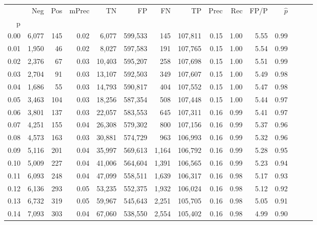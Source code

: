 \begin{tabular}{rrrrrrrrrrrrrrr}
\toprule
{} &     Neg &    Pos & mPrec &       TN &       FP &       FN &       TP &  Prec &   Rec &  FP/P & $\hat{p}$ \\
p    &         &        &       &          &          &          &          &       &       &       &           \\
\midrule
0.00 &   6,077 &    145 &  0.02 &    6,077 &  599,533 &      145 &  107,811 &  0.15 &  1.00 &  5.55 &      0.99 \\
0.01 &   1,950 &     46 &  0.02 &    8,027 &  597,583 &      191 &  107,765 &  0.15 &  1.00 &  5.54 &      0.99 \\
0.02 &   2,376 &     67 &  0.03 &   10,403 &  595,207 &      258 &  107,698 &  0.15 &  1.00 &  5.51 &      0.99 \\
0.03 &   2,704 &     91 &  0.03 &   13,107 &  592,503 &      349 &  107,607 &  0.15 &  1.00 &  5.49 &      0.98 \\
0.04 &   1,686 &     55 &  0.03 &   14,793 &  590,817 &      404 &  107,552 &  0.15 &  1.00 &  5.47 &      0.98 \\
0.05 &   3,463 &    104 &  0.03 &   18,256 &  587,354 &      508 &  107,448 &  0.15 &  1.00 &  5.44 &      0.97 \\
0.06 &   3,801 &    137 &  0.03 &   22,057 &  583,553 &      645 &  107,311 &  0.16 &  0.99 &  5.41 &      0.97 \\
0.07 &   4,251 &    155 &  0.04 &   26,308 &  579,302 &      800 &  107,156 &  0.16 &  0.99 &  5.37 &      0.96 \\
0.08 &   4,573 &    163 &  0.03 &   30,881 &  574,729 &      963 &  106,993 &  0.16 &  0.99 &  5.32 &      0.96 \\
0.09 &   5,116 &    201 &  0.04 &   35,997 &  569,613 &    1,164 &  106,792 &  0.16 &  0.99 &  5.28 &      0.95 \\
0.10 &   5,009 &    227 &  0.04 &   41,006 &  564,604 &    1,391 &  106,565 &  0.16 &  0.99 &  5.23 &      0.94 \\
0.11 &   6,093 &    248 &  0.04 &   47,099 &  558,511 &    1,639 &  106,317 &  0.16 &  0.98 &  5.17 &      0.93 \\
0.12 &   6,136 &    293 &  0.05 &   53,235 &  552,375 &    1,932 &  106,024 &  0.16 &  0.98 &  5.12 &      0.92 \\
0.13 &   6,732 &    319 &  0.05 &   59,967 &  545,643 &    2,251 &  105,705 &  0.16 &  0.98 &  5.05 &      0.91 \\
0.14 &   7,093 &    303 &  0.04 &   67,060 &  538,550 &    2,554 &  105,402 &  0.16 &  0.98 &  4.99 &      0.90 \\

\end{tabular}
